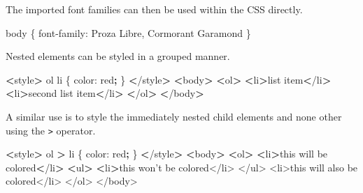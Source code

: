\documentclass[]{book}
\newenvironment{Shaded}{\begin{snugshade}}{\end{snugshade}}
\newcommand{\KeywordTok}[1]{\textcolor[rgb]{0.13,0.29,0.53}{\textbf{#1}}}
\newcommand{\StringTok}[1]{\textcolor[rgb]{0.31,0.60,0.02}{#1}}
\newcommand{\OperatorTok}[1]{\textcolor[rgb]{0.81,0.36,0.00}{\textbf{#1}}}
\newcommand{\ExtensionTok}[1]{#1}
\newcommand{\NormalTok}[1]{#1}
\begin{document}
The imported font families can then be used within the CSS directly.

\begin{Shaded}
\begin{Highlighting}[]
\ExtensionTok{body}\NormalTok{ \{}
    \ExtensionTok{font-family}\NormalTok{: Proza Libre, Cormorant Garamond}
\NormalTok{\}}
\end{Highlighting}
\end{Shaded}

Nested elements can be styled in a grouped manner.

\begin{Shaded}
\begin{Highlighting}[]
\OperatorTok{<}\ExtensionTok{style}\OperatorTok{>}
    \ExtensionTok{ol}\NormalTok{ li \{}
        \ExtensionTok{color}\NormalTok{: red}\KeywordTok{;}
\NormalTok{    \}}
\OperatorTok{<}\NormalTok{/}\ExtensionTok{style}\OperatorTok{>}
\OperatorTok{<}\ExtensionTok{body}\OperatorTok{>}
    \OperatorTok{<}\ExtensionTok{ol}\OperatorTok{>}
        \OperatorTok{<}\ExtensionTok{li}\OperatorTok{>}\NormalTok{list item}\OperatorTok{<}\NormalTok{/li}\OperatorTok{>}
        \OperatorTok{<}\ExtensionTok{li}\OperatorTok{>}\NormalTok{second list item}\OperatorTok{<}\NormalTok{/li}\OperatorTok{>}
    \OperatorTok{<}\NormalTok{/}\ExtensionTok{ol}\OperatorTok{>}
\OperatorTok{<}\NormalTok{/}\ExtensionTok{body}\OperatorTok{>}
\end{Highlighting}
\end{Shaded}

A similar use is to style the immediately nested child elements and none
other using the \texttt{\textgreater{}} operator.

\begin{Shaded}
\begin{Highlighting}[]
\OperatorTok{<}\ExtensionTok{style}\OperatorTok{>}
    \ExtensionTok{ol} \OperatorTok{>}\NormalTok{ li \{}
        \ExtensionTok{color}\NormalTok{: red}\KeywordTok{;}
\NormalTok{    \}}
\OperatorTok{<}\NormalTok{/}\ExtensionTok{style}\OperatorTok{>}
\OperatorTok{<}\ExtensionTok{body}\OperatorTok{>}
    \OperatorTok{<}\ExtensionTok{ol}\OperatorTok{>}
        \OperatorTok{<}\ExtensionTok{li}\OperatorTok{>}\NormalTok{this will be colored}\OperatorTok{<}\NormalTok{/li}\OperatorTok{>}
        \OperatorTok{<}\ExtensionTok{ul}\OperatorTok{>}
            \OperatorTok{<}\ExtensionTok{li}\OperatorTok{>}\NormalTok{this won}\StringTok{'t be colored</li>}
\StringTok{        </ul>}
\StringTok{        <li>this will also be colored</li>}
\StringTok{    </ol>}
\StringTok{</body>}
\end{Highlighting}
\end{Shaded}
\end{document}
